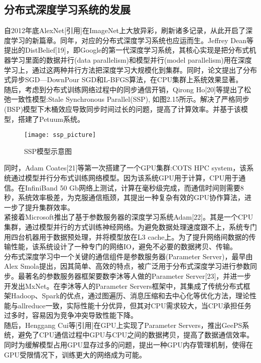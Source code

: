 \subsection{分布式深度学习系统的发展}
自2012年底AlexNet[引用]在ImageNet上大放异彩，刷新诸多记录，从此开启了深度学习的新篇章。同年，对应的分布式深度学习系统也应运而生。Jeffrey Dean等提出的DistBelief[19]，即Google的第一代深度学习系统，其核心实现是把分布式机器学习里面的数据并行(data parallelism)和模型并行(model parallelism)用在深度学习上，通过这两种并行方法把深度学习大规模化到集群。同时，论文提出了分布式异步SGD—DownPour SGD和L-BFGS算法，在CPU集群上系统效果显著。\\
随后，考虑到分布式训练网络过程中的同步通信开销，Qirong Ho[20]等提出了松弛一致性模型:Stale Synchronous Parallel(SSP), 如图2.15所示。解决了严格同步(BSP)模型下木桶效应导致同步时间过长的问题，提高了计算效率。并基于该模型，搭建了Petuum系统。\\
\begin{figure}[htp]
\centering
\texttt{[image: ssp\_picture]}
\caption{SSP模型示意图}
\end{figure}
同时，Adam Coates[21]等第一次搭建了一个GPU集群:COTS HPC system，该系统通过模型并行分布式训练网络模型。因为该系统GPU用于计算，CPU用于通信。在InfiniBand 50 Gb网络上测试，计算在毫秒级完成，而通信时间则需要8秒，系统效率极差，为克服通信瓶颈，其提出一种复杂有效的GPU协作算法，进一步了提升集群效率。\\
紧接着Microsoft推出了基于参数服务器的深度学习系统Adam[22]。其是一个CPU集群，通过模型并行的方式训练神经网络。为避免数据处理速度跟不上，系统专门用四台机器用于数据预处理，并将模型放在L3 cache上。为了提升网络间数据的传输性能，该系统设计了一种专门的网络IO，避免不必要的数据拷贝、传输。\\
分布式深度学习中一个关键的通信组件是参数服务器(Parameter Server)，最早由Alex Smola提出，因其简单、高效的特点，被广泛用于分布式深度学习进行参数同步。最著名的参数服务器框架要数李沐等人做的Parameter Server[23]，并进一步开发出MxNet。在李沐等人的Parameter Servers框架中，其集成了传统分布式框架Hadoop、Spark的优点，通过图遍历、消息压缩和去中心化等优化方法，理论性能与allreduce一致，实际性能十分优异，但其对CPU需求较大，当CPU承担任务过多时，容易因为竞争冲突导致性能下降。\\
随后，Henggang Cui等[引用]在GPU上实现了Parameter Servers，推出GeePS系统，避免了CPU通信过程中GPU与CPU之间的数据拷贝，提高了数据通信效率。同时为缓解模型占用GPU显存过多的问题，提出一种GPU内存管理机制，使得在GPU受限情况下，训练更大的网络成为可能。
